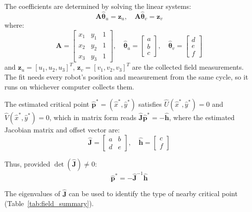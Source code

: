 \documentclass[lettersize,journal]{IEEEtran}
\begin{document}
The coefficients are determined by solving the linear systems:
\begin{equation}\label{eq:4}
\mathbf{A}\hat{\boldsymbol{\theta}}_u = \mathbf{z}_u, \quad \mathbf{A}\hat{\boldsymbol{\theta}}_v = \mathbf{z}_v
\end{equation}
where:
\begin{equation}\label{eq:5}
\mathbf{A} = \begin{bmatrix} x_1 & y_1 & 1 \\ x_2 & y_2 & 1 \\ x_3 & y_3 & 1 \end{bmatrix}, \quad \hat{\boldsymbol{\theta}}_u = \begin{bmatrix} a \\ b \\ c \end{bmatrix}, \quad \hat{\boldsymbol{\theta}}_v = \begin{bmatrix} d \\ e \\ f \end{bmatrix}
\end{equation}
and $\mathbf{z}_u = [u_1, u_2, u_3]^T$, $\mathbf{z}_v = [v_1, v_2, v_3]^T$ are the collected field measurements. The fit needs every robot's position and measurement from the same cycle, so it runs on whichever computer collects them.

The estimated critical point $\hat{\mathbf{p}}^* = (\hat{x}^*, \hat{y}^*)$ satisfies $\hat{U}(\hat{x}^*, \hat{y}^*) = 0$ and $\hat{V}(\hat{x}^*, \hat{y}^*) = 0$, which in matrix form reads $\hat{\mathbf{J}}\hat{\mathbf{p}}^* = -\hat{\mathbf{h}}$, where the estimated Jacobian matrix and offset vector are:
\begin{equation}\label{eq:8}
\hat{\mathbf{J}} = \begin{bmatrix} a & b \\ d & e \end{bmatrix}, \quad \hat{\mathbf{h}} = \begin{bmatrix} c \\ f \end{bmatrix}
\end{equation}

Thus, provided $\det(\hat{\mathbf{J}}) \neq 0$:
\begin{equation}\label{eq:9}
\hat{\mathbf{p}}^* = -\hat{\mathbf{J}}^{-1}\hat{\mathbf{h}}
\end{equation}

The eigenvalues of $\hat{\mathbf{J}}$ can be used to identify the type of nearby critical point (Table~\ref{tab:field_summary}).
\end{document}
